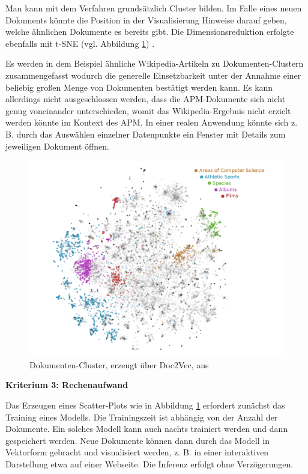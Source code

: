Man kann mit dem Verfahren grundsätzlich Cluster bilden. Im Falle eines neuen Dokuments könnte die Position in der Visualisierung Hinweise darauf geben, welche ähnlichen Dokumente es bereits gibt. Die Dimensionsreduktion erfolgte ebenfalls mit t-SNE (vgl. Abbildung \ref{Abbildung:doc2vec2}) \cite{Dai}. 

Es werden in dem Beispiel ähnliche Wikipedia-Artikeln zu Dokumenten-Clustern zusammengefasst wodurch die generelle Einsetzbarkeit unter der Annahme einer beliebig großen Menge von Dokumenten bestätigt werden kann. Es kann allerdings nicht ausgeschlossen werden, dass die APM-Dokumente sich nicht genug voneinander unterschieden, womit das Wikipedia-Ergebnis nicht erzielt werden könnte im Kontext des APM. In einer realen Anwendung könnte sich z. B. durch das Auswählen einzelner Datenpunkte ein Fenster mit Details zum jeweiligen Dokument öffnen.

\begin{figure}[h]
\centering
\includegraphics[scale=0.95]{content/pics/Picture_15.png}
\caption{Dokumenten-Cluster, erzeugt über Doc2Vec, aus \cite{Dai}}
\label{Abbildung:doc2vec2}
\end{figure}


{\bf Kriterium 3: Rechenaufwand}

Das Erzeugen eines Scatter-Plots wie in Abbildung \ref{Abbildung:doc2vec2} erfordert zunächst das Training eines Modells. Die Trainingszeit ist abhängig von der Anzahl der Dokumente. Ein solches Modell kann auch nachts trainiert werden und dann gespeichert werden. Neue Dokumente können dann durch das Modell in Vektorform gebracht und visualisiert werden, z. B. in einer interaktiven Darstellung etwa auf einer Webseite. Die Inferenz erfolgt ohne Verzögerungen.

